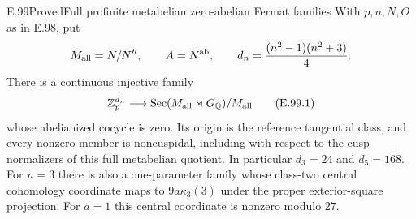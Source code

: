 \begin{result}{E.99}{Proved}{Full profinite metabelian zero-abelian Fermat families}
With \(p,n,N,O\) as in E.98, put
\[
 M_{\rm all}=N/N'',\qquad A=N^{\rm ab},\qquad
 d_n=\frac{(n^2-1)(n^2+3)}4.
\]
There is a continuous injective family
\[
 \mathbb Z_p^{d_n}\longrightarrow
 \operatorname{Sec}(M_{\rm all}\rtimes G_{\mathbb Q})/M_{\rm all}
                                                               \tag{E.99.1}
\]
whose abelianized cocycle is zero.  Its origin is the reference
tangential class, and every nonzero member is noncuspidal, including
with respect to the cusp normalizers of this full metabelian quotient.
In particular \(d_3=24\) and \(d_5=168\).
For \(n=3\) there is also a one-parameter family whose class-two
central cohomology coordinate maps to \(9a\kappa_3(3)\) under the
proper exterior-square projection.  For \(a=1\) this central
coordinate is nonzero modulo \(27\).
\end{result}
